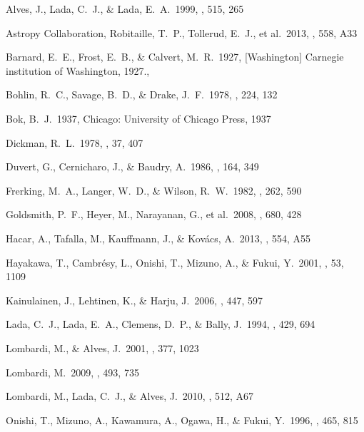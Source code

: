 \documentclass{aa}
\begin{document}
\begin{thebibliography}{}

 Alves, J., Lada, C.~J., \& Lada, E.~A.\ 1999, \apj, 515, 265 

 Astropy Collaboration, Robitaille, T.~P., Tollerud, E.~J., et al.\ 2013, \aap, 558, A33 

 Barnard, E.~E., Frost, E.~B., \& Calvert, M.~R.\ 1927, [Washington] Carnegie institution of Washington, 1927., 

 Bohlin, R.~C., Savage, B.~D., \& Drake, J.~F.\ 1978, \apj, 224, 132 

 Bok, B.~J.\ 1937, Chicago: University of Chicago Press, 1937

 Dickman, R.~L.\ 1978, \apjs, 37, 407 

 Duvert, G., Cernicharo, J., \& Baudry, A.\ 1986, \aap, 164, 349 

 Frerking, M.~A., Langer, W.~D., \& Wilson, R.~W.\ 1982, \apj, 262, 590 

 Goldsmith, P.~F., Heyer, M., Narayanan, G., et al.\ 2008, \apj, 680, 428 

 Hacar, A., Tafalla, M., Kauffmann, J., \& Kov{\'a}cs, A.\ 2013, \aap, 554, A55 

 Hayakawa, T., Cambr{\'e}sy, L., Onishi, T., Mizuno, A., \& Fukui, Y.\ 2001, \pasj, 53, 1109 

 Kainulainen, J., Lehtinen, K., \& Harju, J.\ 2006, \aap, 447, 597 

 Lada, C.~J., Lada, E.~A., Clemens, D.~P., \& Bally, J.\ 1994, \apj, 429, 694 

 Lombardi, M., \& Alves, J.\ 2001, \aap, 377, 1023 

 Lombardi, M.\ 2009, \aap, 493, 735 

 Lombardi, M., Lada, C.~J., \& Alves, J.\ 2010, \aap, 512, A67 

 Onishi, T., Mizuno, A., Kawamura, A., Ogawa, H., \& Fukui, Y.\ 1996, \apj, 465, 815 


\end{thebibliography}
\end{document}
